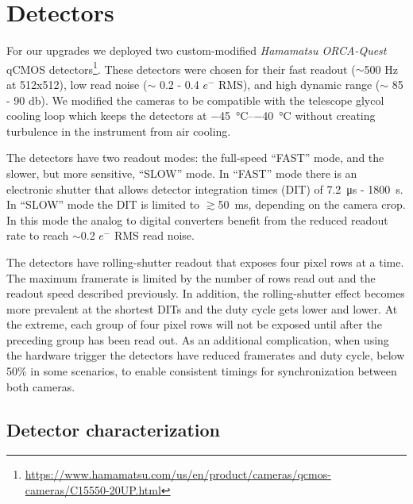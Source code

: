 \section{Detectors}\label{sec:detectors}

For our upgrades we deployed two custom-modified \textit{Hamamatsu ORCA-Quest} qCMOS detectors\footnote{\url{https://www.hamamatsu.com/us/en/product/cameras/qcmos-cameras/C15550-20UP.html}}. These detectors were chosen for their fast readout ($\sim$500 Hz at 512x512), low read noise ($\sim$ 0.2 - 0.4 $e^-$ RMS), and high dynamic range ($\sim$ 85 - 90 \si{\decibel}). We modified the cameras to be compatible with the telescope glycol cooling loop which keeps the detectors at \SIrange{-45}{-40}{\celsius} without creating turbulence in the instrument from air cooling.

The detectors have two  readout modes: the full-speed ``FAST'' mode, and the slower, but more sensitive, ``SLOW'' mode. In ``FAST'' mode there is an electronic shutter that allows detector integration times (DIT) of \SI{7.2}{\micro\second} - \SI{1800}{\second}. In ``SLOW'' mode the DIT is limited to $\gtrsim$\SI{50}{\milli\second}, depending on the camera crop. In this mode the analog to digital converters benefit from the reduced readout rate to reach $\sim$0.2 $e^-$ RMS read noise.

The detectors have rolling-shutter readout that exposes four pixel rows at a time. The maximum framerate is limited by the number of rows read out and the readout speed described previously. In addition, the rolling-shutter effect becomes more prevalent at the shortest DITs and the duty cycle gets lower and lower. At the extreme, each group of four pixel rows will not be exposed until after the preceding group has been read out. As an additional complication, when using the hardware trigger the detectors have reduced framerates and duty cycle, below 50\% in some scenarios, to enable consistent timings for synchronization between both cameras.

\subsection{Detector characterization}

